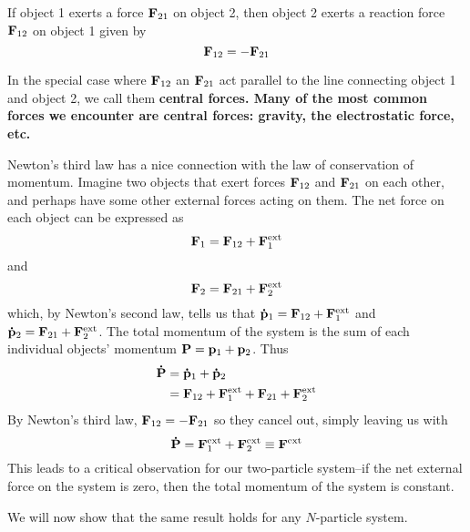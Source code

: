 \begin{theorem}
    If object 1 exerts a force $\mathbf{F}_{21}$ on object 2, then object 2 exerts a reaction force $\mathbf{F}_{12}$ on object 1 given by
    \begin{equation}
        \mathbf{F}_{12} = -\mathbf{F}_{21}
    \end{equation}
\end{theorem}
In the special case where $\mathbf{F}_{12}$ an $\mathbf{F}_{21}$ act parallel to the line connecting object 1 and object 2, we call them \bf{central forces}. Many of the most common forces we encounter are central forces: gravity, the electrostatic force, etc.

Newton's third law has a nice connection with the law of conservation of momentum. Imagine two objects that exert forces $\mathbf{F}_{12}$ and $\mathbf{F}_{21}$ on each other, and perhaps have some other external forces acting on them. The net force on each object can be expressed as 
\[ \mathbf{F}_1 = \mathbf{F}_{12} + \mathbf{F}^{\text{ext}}_1 \]
and
\[ \mathbf{F}_2 = \mathbf{F}_{21} + \mathbf{F}^{\text{ext}}_2 \]
which, by Newton's second law, tells us that $\mathbf{\dot p}_1 = \mathbf{F}_{12} + \mathbf{F}^{\text{ext}}_1$ and $\mathbf{\dot p}_2 = \mathbf{F}_{21} + \mathbf{F}^{\text{ext}}_2$. The total momentum of the system is the sum of each individual objects' momentum $\mathbf{P} = \mathbf{p}_1 + \mathbf{p}_2$. Thus
\begin{align*}
    \mathbf{\dot P} &= \mathbf{\dot p}_1 + \mathbf{\dot p}_2 \\
    &= \mathbf{F}_{12} + \mathbf{F}^{\text{ext}}_1 + \mathbf{F}_{21} + \mathbf{F}^{\text{ext}}_2
\end{align*}
By Newton's third law, $\mathbf{F}_{12} = -\mathbf{F}_{21}$ so they cancel out, simply leaving us with
\[ \mathbf{\dot P} = \mathbf{F}^{\text{ext}}_1 + \mathbf{F}^{\text{ext}}_2 \equiv \mathbf{F}^{\text{ext}}\]
This leads to a critical observation for our two-particle system--if the net external force on the system is zero, then the total momentum of the system is constant.

We will now show that the same result holds for any $N$-particle system.

